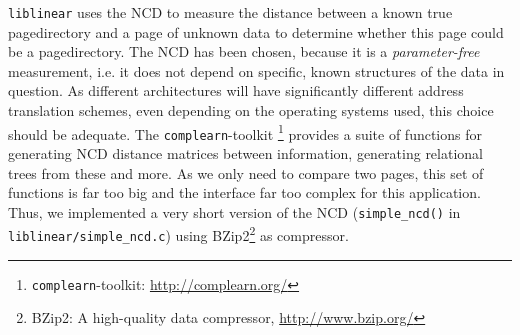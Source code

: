 \texttt{liblinear} uses the NCD to measure the distance between a known true
pagedirectory and a page of unknown data to determine whether this page could be
a pagedirectory. The NCD has been chosen, because it is a \emph{parameter-free}
measurement, i.e. it does not depend on specific, known structures of the data
in question. As different architectures will have significantly different
address translation schemes, even depending on the operating systems used, this
choice should be adequate. The \texttt{complearn}-toolkit
\footnote{\texttt{complearn}-toolkit:
\href{http://complearn.org/}{http://complearn.org/}} provides a suite of
functions for generating NCD distance matrices between information, generating
relational trees from these and more.  As we only need to compare two pages,
this set of functions is far too big and the interface far too complex for this
application.  Thus, we implemented a very short version of the NCD
(\texttt{simple\_ncd()} in \texttt{liblinear/simple\_ncd.c}) using
BZip2\footnote{BZip2: A high-quality data compressor,
\href{http://www.bzip.org/}{http://www.bzip.org/}} as compressor.

